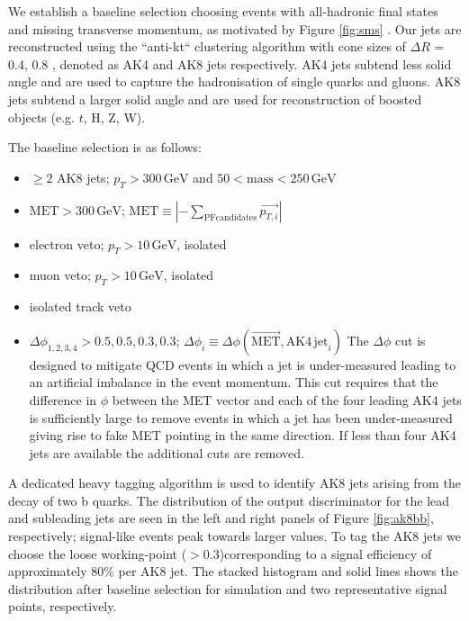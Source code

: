 We establish a baseline selection choosing events with all-hadronic final states and missing transverse momentum, as motivated by Figure \ref{fig:sms} . Our jets are reconstructed using the ``anti-kt`` clustering algorithm with cone sizes of $\Delta R$ = 0.4, 0.8 \cite{1126-6708-2008-04-063}, denoted as AK4 and AK8 jets respectively. AK4 jets subtend less solid angle and are used to capture the hadronisation of single quarks and gluons. AK8 jets subtend a larger solid angle and are used for reconstruction of boosted objects (e.g. $t$, H, Z, W).

The baseline selection is as follows:

\begin{itemize}
\item $\geq2$ AK8 jets; $p_{T} > 300\,\mathrm{GeV}$ and $50 < \mathrm{mass} < 250\,\mathrm{GeV}$
\item $\mathrm{MET} > 300\,\mathrm{GeV}$; $\mathrm{MET}\equiv |-\sum_{\mathrm{PFcandidates}}\vec{p_{T, i}}|$
\item electron veto; $p_{T}>10\,\mathrm{GeV}$, isolated
\item muon veto; $p_{T}>10\,\mathrm{GeV}$, isolated
\item isolated track veto
\item $\Delta\phi_{1, 2, 3, 4} > 0.5, 0.5, 0.3, 0.3$; $\Delta\phi_{i}\equiv \Delta\phi(\vec{\mathrm{MET}}, \mathrm{AK4\,jet}_{i})$\newline
The $\Delta\phi$ cut is designed to mitigate QCD events in which a jet is under-measured leading to an artificial imbalance in the event momentum. This cut requires that the difference in $\phi$ between the MET vector and each of the four leading AK4 jets is sufficiently large to remove events in which a jet has been under-measured giving rise to fake MET pointing in the same direction. If less than four AK4 jets are available the additional cuts are removed.
\end{itemize}

A dedicated heavy tagging algorithm is used to identify AK8 jets arising from the decay of two b quarks. The distribution of the output discriminator for the lead and subleading jets are seen in the left and right panels of Figure \ref{fig:ak8bb}, respectively; signal-like events peak towards larger values. To \bbbar tag the AK8 jets we choose the loose working-point ($>0.3$)corresponding to a signal efficiency of approximately $80\%$ per AK8 jet. The stacked histogram and solid lines shows the distribution after baseline selection for simulation and two representative signal points, respectively.

